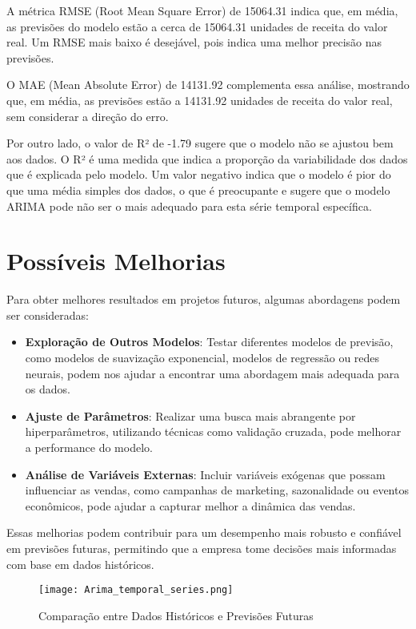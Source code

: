 \documentclass[a4paper,12pt]{article}
\begin{document}
A métrica RMSE (Root Mean Square Error) de 15064.31 indica que, em média, as previsões do modelo estão a cerca de 15064.31 unidades de receita do valor real. Um RMSE mais baixo é desejável, pois indica uma melhor precisão nas previsões. 

O MAE (Mean Absolute Error) de 14131.92 complementa essa análise, mostrando que, em média, as previsões estão a 14131.92 unidades de receita do valor real, sem considerar a direção do erro.

Por outro lado, o valor de R² de -1.79 sugere que o modelo não se ajustou bem aos dados. O R² é uma medida que indica a proporção da variabilidade dos dados que é explicada pelo modelo. Um valor negativo indica que o modelo é pior do que uma média simples dos dados, o que é preocupante e sugere que o modelo ARIMA pode não ser o mais adequado para esta série temporal específica.

\section{Possíveis Melhorias}

Para obter melhores resultados em projetos futuros, algumas abordagens podem ser consideradas:

\begin{itemize}
    \item \textbf{Exploração de Outros Modelos}: Testar diferentes modelos de previsão, como modelos de suavização exponencial, modelos de regressão ou redes neurais, podem nos ajudar a encontrar uma abordagem mais adequada para os dados.
    \item \textbf{Ajuste de Parâmetros}: Realizar uma busca mais abrangente por hiperparâmetros, utilizando técnicas como validação cruzada, pode melhorar a performance do modelo.
    \item \textbf{Análise de Variáveis Externas}: Incluir variáveis exógenas que possam influenciar as vendas, como campanhas de marketing, sazonalidade ou eventos econômicos, pode ajudar a capturar melhor a dinâmica das vendas.
\end{itemize}

Essas melhorias podem contribuir para um desempenho mais robusto e confiável em previsões futuras, permitindo que a empresa tome decisões mais informadas com base em dados históricos.

\begin{figure}[H]
    \centering
    \texttt{[image: Arima\_temporal\_series.png]} %
    \caption{Comparação entre Dados Históricos e Previsões Futuras}
    \label{fig:comparacao}
\end{figure}
\end{document}
